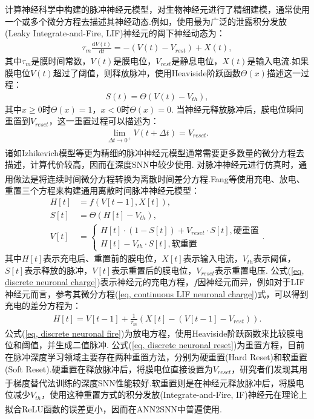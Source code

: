 \documentclass[10.5pt,compsoc,UTF8]{CjC}
\theoremstyle{mystyle}
\newcommand{\upcite}[1]{\textsuperscript{\cite{#1}}}
\begin{document}
\begin{multicols}{1}
计算神经科学中构建的脉冲神经元模型，对生物神经元进行了精细建模，通常使用一个或多个微分方程去描述其神经动态.例如，使用最为广泛的泄露积分发放(Leaky Integrate-and-Fire, LIF)神经元的阈下神经动态为：
\begin{eqnarray}
	\tau_{m} \frac{\mathrm{d}V(t)}{\mathrm{d}t} = -(V(t) - V_{rest}) + X(t),
	\label{eq, continuous LIF neuronal charge}
\end{eqnarray}
其中$\tau_{m}$是膜时间常数，$V(t)$是膜电位，$V_{rest}$是静息电位，$X(t)$是输入电流.如果膜电位$V(t)$超过了阈值，则释放脉冲，使用Heaviside阶跃函数$\Theta(x)$描述这一过程：
\begin{eqnarray}
	S(t) = \Theta(V(t) - V_{th}),
	\label{eq, continuous neuronal fire}
\end{eqnarray}
其中$x \ge 0$时$\Theta(x) = 1$，$x < 0$时$\Theta(x) = 0$.
当神经元释放脉冲后，膜电位瞬间重置到$V_{reset}$，这一重置过程可以描述为：
\begin{eqnarray}
	\lim_{\Delta t \rightarrow 0^{+}} V(t + \Delta t) = V_{reset}. \label{eq, continuous neuronal reset}
\end{eqnarray}
诸如Izhikevich模型\upcite{izhikevich2003simple}等更为精细的脉冲神经元模型通常需要更多数量的微分方程去描述，计算代价较高，因而在深度SNN中较少使用.
对脉冲神经元进行仿真时，通用做法是将连续时间微分方程转换为离散时间差分方程.Fang等\upcite{fang2021incorporating, doi:10.1126/sciadv.adi1480}使用充电、放电、重置三个方程来构建通用离散时间脉冲神经元模型：
\begin{align}
	H[t] &= f(V[t-1], X[t]), \label{eq, discrete neuronal charge}\\
	S[t] &= \Theta(H[t] - V_{th}), \label{eq, discrete neuronal fire}\\
	V[t] &= \begin{cases}
		H[t] \cdot (1 - S[t]) + V_{reset} \cdot S[t], \text{硬重置}\\
		H[t] - V_{th} \cdot S[t], \text{软重置}
	\end{cases}. \label{eq, discrete neuronal reset}
\end{align}
其中$H[t]$表示充电后、重置前的膜电位，$X[t]$表示输入电流，$V_{th}$表示阈值，$S[t]$表示释放的脉冲，$V[t]$表示重置后的膜电位，$V_{reset}$表示重置电压.
公式(\ref{eq, discrete neuronal charge})表示神经元的充电方程，$f$因神经元而异，例如对于LIF神经元而言，参考其微分方程(\ref{eq, continuous LIF neuronal charge})式，可以得到充电的差分方程为：
\begin{eqnarray}
	H[t] = V[t-1] + \frac{1}{\tau_{m}}(X[t]-(V[t-1] - V_{rest})).
	\label{eq, discrete LIF neuronal charge}
\end{eqnarray}
公式(\ref{eq, discrete neuronal fire})为放电方程，使用Heaviside阶跃函数来比较膜电位和阈值，并生成二值脉冲.
公式(\ref{eq, discrete neuronal reset})为重置方程，目前在脉冲深度学习领域主要存在两种重置方法，分别为硬重置(Hard Reset)和软重置(Soft Reset).硬重置在释放脉冲后，将膜电位直接设置为$V_{reset}$，研究者们发现其用于梯度替代法训练的深度SNN性能较好\upcite{ledinauskas2020training}.软重置则是在神经元释放脉冲后，将膜电位减少$V_{th}$，使用这种重置方式的积分发放(Integrate-and-Fire, IF)神经元在理论上拟合ReLU函数的误差更小\upcite{Bodo2017Conversion}，因而在ANN2SNN中普遍使用.


\end{multicols}
\end{document}

